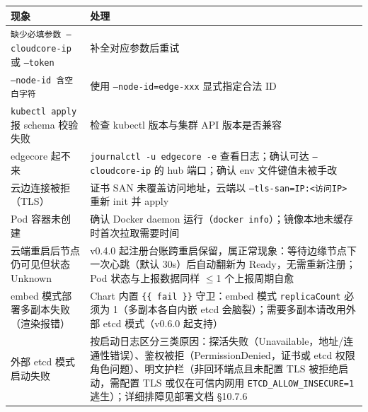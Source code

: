 \begin{tabularx}{\textwidth}{|l|X|}
  \hline
  \textbf{现象} & \textbf{处理} \\
  \hline
  \texttt{缺少必填参数 --cloudcore-ip} 或 \texttt{--token} & 补全对应参数后重试 \\
  \hline
  \texttt{--node-id 含空白字符} & 使用 \texttt{--node-id=edge-xxx} 显式指定合法 ID \\
  \hline
  \texttt{kubectl apply} 报 schema 校验失败 & 检查 kubectl 版本与集群 API 版本是否兼容 \\
  \hline
  edgecore 起不来 & \texttt{journalctl -u edgecore -e} 查看日志；确认可达 \texttt{--cloudcore-ip} 的 hub 端口；确认 env 文件键值未被手改 \\
  \hline
  云边连接被拒（TLS） & 证书 SAN 未覆盖访问地址，云端以 \texttt{--tls-san=IP:<访问IP>} 重新 init 并 apply \\
  \hline
  Pod 容器未创建 & 确认 Docker daemon 运行（\texttt{docker info}）；镜像本地未缓存时首次拉取需要时间 \\
  \hline
  云端重启后节点仍可见但状态 Unknown & v0.4.0 起注册台账跨重启保留，属正常现象：等待边缘节点下一次心跳（默认 30s）后自动翻新为 Ready，无需重新注册；Pod 状态与上报数据同样 $\le$1 个上报周期自愈 \\
  \hline
  embed 模式部署多副本失败（渲染报错） & Chart 内置 \texttt{\{\{ fail \}\}} 守卫：embed 模式 \texttt{replicaCount} 必须为 1（多副本各自内嵌 etcd 会脑裂）；需要多副本请改用外部 etcd 模式（v0.6.0 起支持） \\
  \hline
  外部 etcd 模式启动失败 & 按启动日志区分三类原因：探活失败（Unavailable，地址/连通性错误）、鉴权被拒（PermissionDenied，证书或 etcd 权限角色问题）、明文护栏（非回环端点且未配置 TLS 被拒绝启动，需配置 TLS 或仅在可信内网用 \texttt{ETCD\_ALLOW\_INSECURE=1} 逃生）；详细排障见部署文档 §10.7.6 \\
  \hline
\end{tabularx}
